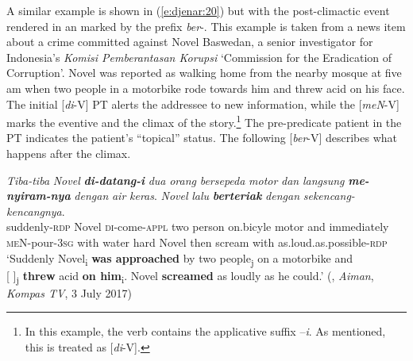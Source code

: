 \documentclass[output=paper
,modfonts
,nonflat]{langsci/langscibook}
\begin{document}
\noindent
A similar example is shown in (\ref{e:djenar:20}) but with the post-climactic event rendered in an  marked by the prefix \textit{ber}-. This example is taken from a news item about a crime committed against Novel Baswedan, a senior investigator for Indonesia’s \textit{Komisi Pemberantasan Korupsi} ‘Commission for the Eradication of Corruption’. Novel was reported as walking home from the nearby mosque at five am when two people in a motorbike rode towards him and threw acid on his face. The initial [\textit{di}-V] PT  alerts the addressee to new information, while the [\textit{meN}-V] marks the eventive  and the climax of the story.\footnote{In this example, the verb contains the applicative suffix –\textit{i}. As mentioned, this is treated as [\textit{di}-V].}  The pre-predicate patient in the PT  indicates the patient’s “topical” status. The following [\textit{ber}-V]  describes what happens after the climax.

\begin{exe}
	\ex\label{e:djenar:20}
	\gll \textit{Tiba-tiba} \textit{Novel} \textbf{\textit{di-datang-i}} \textit{dua} \textit{orang} \textit{bersepeda} \textit{motor} \textit{dan} \textit{langsung} \textbf{\textit{me-nyiram-nya}} \textit{dengan} \textit{air} \textit{keras}. \textit{Novel} \textit{lalu} \textbf{\textit{berteriak}} \textit{dengan} \textit{sekencang-kencangnya}.\\
	suddenly-\textsc{rdp} Novel \textsc{di}-come-\textsc{appl} two person on.bicyle motor and immediately \textsc{meN}-pour-3\textsc{sg} with water hard Novel then scream with as.loud.as.possible-\textsc{rdp}\\
	\glt ‘Suddenly Novel\textsubscript{i} \textbf{was approached} by two people\textsubscript{j} on a motorbike and \\{[ ]}\textsubscript{j} \textbf{threw} acid \textbf{on him}\textsubscript{i}. Novel \textbf{screamed} as loudly as he could.’ (, \textit{Aiman}, \textit{Kompas TV}, 3 July 2017)
\end{exe}
\end{document}
